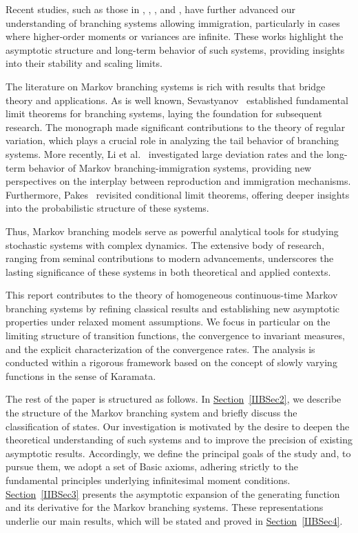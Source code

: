 \documentclass[10pt,reqno]{amsart}
\theoremstyle{definition}
\numberwithin{equation}{section}
\begin{document}
    Recent studies, such as those in {\cite{ImSM23}}, {\cite{ImUfa21}}, {\cite{MitovYa25}}, {\cite{MitovYa17}} and
    {\cite{Rahimov21}}, have further advanced our understanding of branching systems allowing immigration, particularly
    in cases where higher-order moments or variances are infinite. These works highlight the asymptotic structure and
    long-term behavior of such systems, providing insights into their stability and scaling limits.

    The literature on Markov branching systems is rich with results that bridge theory and applications. As is well
    known, Sevastyanov~{\cite{Sev57,Sev51}} established fundamental limit theorems for branching systems, laying the
    foundation for subsequent research. The monograph {\cite{Bingham}} made significant contributions to the theory
    of regular variation, which plays a crucial role in analyzing the tail behavior of branching systems. More recently,
    Li et al.~{\cite{LiDEDS21,LiChPaCh20}} investigated large deviation rates and the long-term behavior of Markov
    branching-immigration systems, providing new perspectives on the interplay between reproduction and immigration
    mechanisms. Furthermore, Pakes~{\cite{Pakes99}} revisited conditional limit theorems, offering deeper insights
    into the probabilistic structure of these systems.

    Thus, Markov branching models serve as powerful analytical tools for studying stochastic systems with complex dynamics.
    The extensive body of research, ranging from seminal contributions to modern advancements, underscores the lasting
    significance of these systems in both theoretical and applied contexts.

    This report contributes to the theory of homogeneous continuous-time Markov branching systems by refining classical
    results and establishing new asymptotic properties under relaxed moment assumptions. We focus in particular on the
    limiting structure of transition functions, the convergence to invariant measures, and the explicit characterization
    of the convergence rates. The analysis is conducted within a rigorous framework based on the concept of slowly
    varying functions in the sense of Karamata.

    The rest of the paper is structured as follows. In {\hyperref[IIBSec2]{Section}~\ref{IIBSec2}}, we describe the
    structure of the Markov branching system and briefly discuss the classification of states. Our investigation
    is motivated by the desire to deepen the theoretical understanding of such systems and to improve the precision
    of existing asymptotic results. Accordingly, we define the principal goals of the study and, to pursue them,
    we adopt a set of Basic axioms, adhering strictly to the fundamental principles underlying infinitesimal moment
    conditions. {\hyperref[IIBSec3]{Section}~\ref{IIBSec3}} presents the asymptotic expansion of the generating
    function and its derivative for the Markov branching systems. These representations underlie our main results,
    which will be stated and proved in {\hyperref[IIBSec4]{Section}~\ref{IIBSec4}}.
\end{document}
